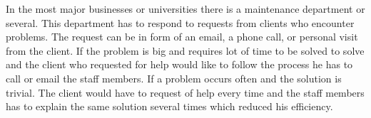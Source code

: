 In the most major businesses or universities there is a maintenance department or several. 
This department has to respond to requests from clients who encounter problems. 
The request can be in form of an email, a phone call, or personal visit from the client. 
If the problem is big and requires lot of time to be solved to solve and the client who requested for help would like to follow the process he has to call or email the staff members. 
If a problem occurs often and the solution is trivial. 
The client would have to request of help every time and the staff members has to explain the same solution several times which reduced his efficiency. 
